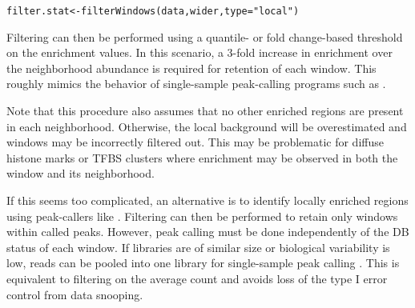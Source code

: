 \documentclass{report}\usepackage[]{graphicx}\usepackage[usenames,dvipsnames]{color}
\newcommand{\hlnum}[1]{\textcolor[rgb]{0.816,0.125,0.439}{#1}}%
\newcommand{\hlstr}[1]{\textcolor[rgb]{0.251,0.627,0.251}{#1}}%
\newcommand{\hlopt}[1]{\textcolor[rgb]{0,0,0}{#1}}%
\newcommand{\hlstd}[1]{\textcolor[rgb]{0.251,0.251,0.251}{#1}}%
\newcommand{\hlkwb}[1]{\textcolor[rgb]{0,0,0}{#1}}%
\newcommand{\hlkwc}[1]{\textcolor[rgb]{0.251,0.251,0.251}{#1}}%
\newcommand{\hlkwd}[1]{\textcolor[rgb]{0.878,0.439,0.125}{#1}}%
\newenvironment{knitrout}{}{} %
\begin{document}
\begin{knitrout}
\color{fgcolor}\begin{kframe}
\begin{alltt}
\hlstd{filter.stat} \hlkwb{<-} \hlkwd{filterWindows}\hlstd{(data, wider,} \hlkwc{type}\hlstd{=}\hlstr{"local"}\hlstd{)}
\end{alltt}
\end{kframe}
\end{knitrout}

Filtering can then be performed using a quantile- or fold change-based threshold on the enrichment values. 
In this scenario, a 3-fold increase in enrichment over the neighborhood abundance is required for retention of each window.
This roughly mimics the behavior of single-sample peak-calling programs such as  \cite{zhang2008}.

\begin{knitrout}
\color{fgcolor}
\end{knitrout}

Note that this procedure also assumes that no other enriched regions are present in each neighborhood.
Otherwise, the local background will be overestimated and windows may be incorrectly filtered out. 
This may be problematic for diffuse histone marks or TFBS clusters where enrichment may be observed in both the window and its neighborhood.

If this seems too complicated, an alternative is to identify locally enriched regions using peak-callers like .
Filtering can then be performed to retain only windows within called peaks.  
However, peak calling must be done independently of the DB status of each window. 
If libraries are of similar size or biological variability is low, reads can be pooled into one library for single-sample peak calling \cite{lun2014}. 
This is equivalent to filtering on the average count and avoids loss of the type I error control from data snooping.
\end{document}

